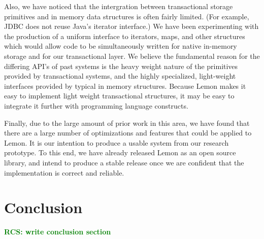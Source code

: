 \documentclass[letterpaper,twocolumn,english]{article}
\newcommand{\yad}{Lemon\xspace}
\newcommand{\rcs}[1]{\textcolor{green}{\bf RCS: #1}}
\newcommand{\mjd}[1]{\textcolor{blue}{\bf MJD: #1}}
\begin{document}
Also, we have noticed that the intergration between transactional
storage primitives and in memory data structures is often fairly
limited.  (For example, JDBC does not reuse Java's iterator
interface.)  We have been experimenting with the production of a
uniform interface to iterators, maps, and other structures which would
allow code to be simultaneously written for native in-memory storage
and for our transactional layer.  We believe the fundamental reason
for the differing API's of past systems is the heavy weight nature of
the primitives provided by transactional systems, and the highly
specialized, light-weight interfaces provided by typical in memory
structures.  Because \yad makes it easy to implement light weight
transactional structures, it may be easy to integrate it further with
programming language constructs.

Finally, due to the large amount of prior work in this area, we have
found that there are a large number of optimizations and features that
could be applied to \yad.  It is our intention to produce a usable
system from our research prototype.  To this end, we have already
released \yad as an open source library, and intend to produce a
stable release once we are confident that the implementation is correct
and reliable.  


\section{Conclusion}



\rcs{write conclusion section}
\end{document}
